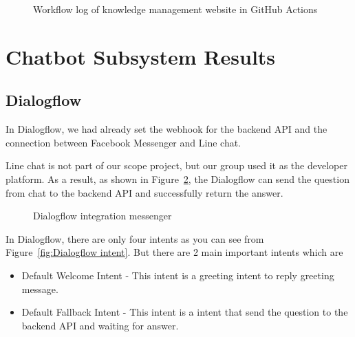 \documentclass[12pt,oneside,openright,a4paper]{cpe-english-project}
\begin{document}
\begin{figure}[!h]\centering
	\caption{Workflow log of knowledge management website in GitHub Actions}\label{fig:ci-cd-fe}
\end{figure}

\pagebreak
\section{Chatbot Subsystem Results}
\subsection{Dialogflow}
In Dialogflow, we had already set the webhook for the backend API
and the connection between Facebook Messenger and Line chat.

Line chat is not part of our scope project,
but our group used it as the developer platform.
As a result, as shown in Figure~\ref*{fig:line_example},
the Dialogflow can send the question from chat to the backend API and successfully return the answer.

\begin{figure}[!h]\centering
	\caption{Dialogflow integration messenger}\label{fig:line_example}
\end{figure}
In Dialogflow, there are only four intents as you can see from Figure~\ref*{fig:Dialogflow intent}.
But there are 2 main important intents which are\begin{itemize}
	\item Default Welcome Intent - This intent is a greeting intent to reply greeting message.
	\item Default Fallback Intent - This intent is a intent that send the question to the backend API and waiting for answer.
\end{itemize}
\end{document}
